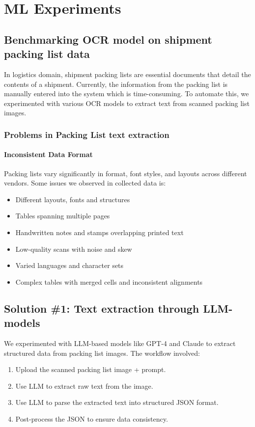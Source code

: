 \section{ML Experiments}

\subsection{Benchmarking OCR model on shipment packing list data}
In logistics domain, shipment packing lists are essential documents that detail the contents of a shipment. Currently, the information from the packing list is manually entered into the system which is time-consuming. To automate this, we experimented with various OCR models to extract text from scanned packing list images.

\subsubsection{Problems in Packing List text extraction}
\paragraph{Inconsistent Data Format}
Packing lists vary significantly in format, font styles, and layouts across different vendors. Some issues we observed in collected data is:
\begin{itemize}
    \item Different layouts, fonts and structures
    \item Tables spanning multiple pages
    \item Handwritten notes and stamps overlapping printed text
    \item Low-quality scans with noise and skew
    \item Varied languages and character sets
    \item Complex tables with merged cells and inconsistent alignments
\end{itemize}

\subsection{Solution \#1: Text extraction through LLM-models}
We experimented with LLM-based models like GPT-4 and Claude to extract structured data from packing list images. The workflow involved:
\begin{enumerate}
    \item Upload the scanned packing list image + prompt.
    \item Use LLM to extract raw text from the image.
    \item Use LLM to parse the extracted text into structured JSON format.
    \item Post-process the JSON to ensure data consistency.
\end{enumerate} 
